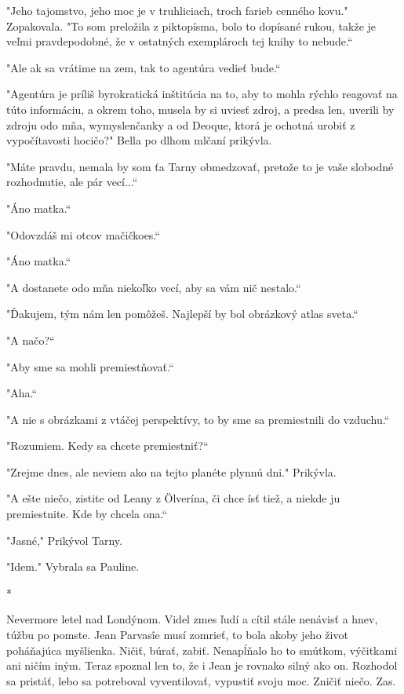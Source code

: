 \documentclass{book}
\begin{document}
"$ $Jeho tajomstvo, jeho moc je v truhliciach, troch farieb cenného kovu."$ $ Zopakovala. "$ $To som preložila z piktopísma, bolo to dopísané rukou, takže je veľmi pravdepodobné, že v ostatných exemplároch tej knihy to nebude.“

"$ $Ale ak sa vrátime na zem, tak to agentúra vedieť bude.“

"$ $Agentúra je príliš byrokratická inštitúcia na to, aby to mohla rýchlo reagovať na túto informáciu, a okrem toho, musela by si uviesť zdroj, a predsa len, uverili by zdroju odo mňa, wymyslenčanky a od Deoque, ktorá je ochotná urobiť z vypočítavosti hocičo?"$ $ Bella po dlhom mlčaní prikývla.

"$ $Máte pravdu, nemala by som ťa Tarny obmedzovať, pretože to je vaše slobodné rozhodnutie, ale pár vecí...“

"$ $Áno matka.“

"$ $Odovzdáš mi otcov mačičkoes.“

"$ $Áno matka.“

"$ $A dostanete odo mňa niekoľko vecí, aby sa vám nič nestalo.“

"$ $Ďakujem, tým nám len pomôžeš. Najlepší by bol obrázkový atlas sveta.“

"$ $A načo?“

"$ $Aby sme sa mohli premiestňovať.“

"$ $Aha.“

"$ $A nie s obrázkami z vtáčej perspektívy, to by sme sa premiestnili do vzduchu.“

"$ $Rozumiem. Kedy sa chcete premiestniť?“

"$ $Zrejme dnes, ale neviem ako na tejto planéte plynnú dni."$ $ Prikývla.

"$ $A ešte niečo, zistite od Leany z Ölverína, či chce ísť tiež, a niekde ju premiestnite. Kde by chcela ona.“

"$ $Jasné,"$ $ Prikývol Tarny.

"$ $Idem."$ $ Vybrala sa Pauline.

\begin{center}
*
\end{center}

Nevermore letel nad Londýnom. Videl zmes ľudí a cítil stále nenávisť a hnev, túžbu po pomste. Jean Parvasîe musí zomrieť, to bola akoby jeho život poháňajúca myšlienka. Ničiť, búrať, zabiť. Nenapĺňalo ho to smútkom, výčitkami ani ničím iným. Teraz spoznal len to, že i Jean je rovnako silný ako on. Rozhodol sa pristáť, lebo sa potreboval vyventilovať, vypustiť svoju moc. Zničiť niečo. Zas.
\end{document}
